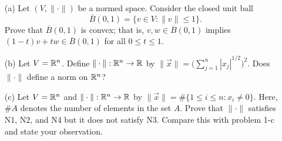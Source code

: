 \documentclass[a4paper]{article}
\begin{document}
\begin{problem}
   \begin{enumerate}
       \item[(a)] Let \( (V, \|\cdot\|) \) be a normed space. Consider the closed unit ball \[ \overline{B}(0,1) = \{  v \in V : \|v \| \leq 1  \}.  \]
           Prove that \( \overline{B}(0,1) \) is convex; that is, \( v,w \in \overline{B}(0,1) \) implies \( (1-t) v + tw \in \overline{B}(0,1) \) for all \( 0 \leq t \leq  1  \).
   \item[(b)] Let \( V = \mathbb{R}^{n}  \). Define \( \|\cdot\|: \mathbb{R}^{n} \to \mathbb{R}  \) by \( \|\vec{ x } \| = \Big(  \sum_{ j=1  }^{ n } | {x}_{j} |^{1/2} \Big)^{2} \). Does \( \|\cdot\|  \) define a norm on \( \mathbb{R}^{n} \)? 
   \item[(c)] Let \( V = \mathbb{R}^{n} \) and \( \|\cdot\|: \mathbb{R}^{n} \to \mathbb{R}  \) by \( \|\vec{ x } \| = \# \{  1 \leq i \leq n : {x}_{i} \neq 0  \}  \). Here, \( \# A  \) denotes the number of elements in the set \( A  \). Prove that \( \|\cdot\| \) satisfies N1, N2, and N4 but it does not satisfy N3. Compare this with problem 1-c and state your observation. 
   \end{enumerate} 
\end{problem}
\end{document}
